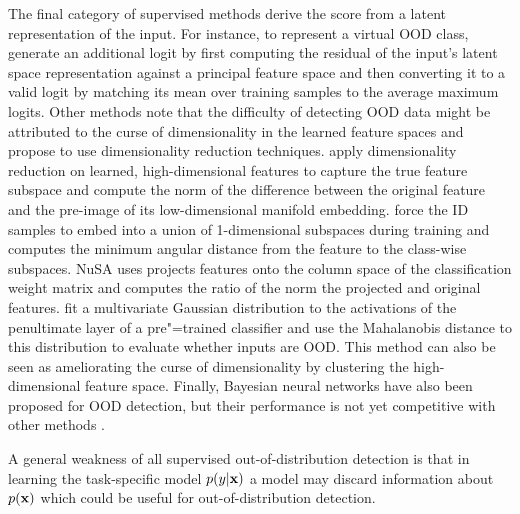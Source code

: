 The final category of supervised methods derive the score from a latent representation of the input. 
For instance, to represent a virtual OOD class, \textcite{wang_vim_2022} generate an additional logit by first computing the residual of the input's latent space representation against a principal feature space and then converting it to a valid logit by matching its mean over training samples to the average maximum logits. 
Other methods note that the difficulty of detecting OOD data might be attributed to the curse of dimensionality in the learned feature spaces and propose to use dimensionality reduction techniques. \textcite{ndiour_outofdistribution_2020} apply dimensionality reduction on learned, high-dimensional features to capture the true feature subspace and compute the norm of the difference between the original feature and the pre-image of its low-dimensional manifold embedding. 
\textcite{zaeemzadeh_outofdistribution_2021} force the ID samples to embed into a union of 1-dimensional subspaces during training and computes the minimum angular distance from the feature to the class-wise subspaces. 
NuSA \parencite{cook_outlier_2020} uses projects features onto the column space of the classification weight matrix and computes the ratio of the norm the projected and original features.
\textcite{lee_simple_2018} fit a multivariate Gaussian distribution to the activations of the penultimate layer of a pre"=trained classifier and use the Mahalanobis distance to this distribution to evaluate whether inputs are OOD. This method can also be seen as ameliorating the curse of dimensionality by clustering the high-dimensional feature space. 
Finally, Bayesian neural networks have also been proposed for OOD detection, but their performance is not yet competitive with other methods \parencite{henning_are_2021,dangelo_outofdistribution_2022,nguyen_out_2022}. 


A general weakness of all supervised out-of-distribution detection is that in learning the task-specific model $p(y|{\mathbf{x}})$ a model may discard information about $p({\mathbf{x}})$ which could be useful for out-of-distribution detection.



